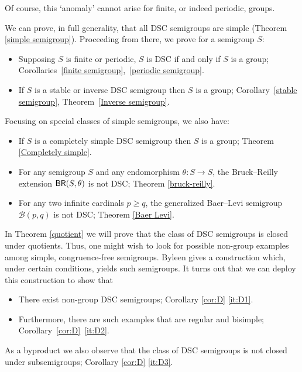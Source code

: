 \documentclass[a4paper, 12pt,reqno]{amsart}
\theoremstyle{plain}
\theoremstyle{definition}
\theoremstyle{remark}
\newcommand{\BR}{\textup{\textsf{BR}}}
\newcommand{\B}{\mathcal{B}}
\newenvironment{nitemize}{\begin{itemize}[label=\textbullet, leftmargin=5mm]}{\end{itemize}}
\begin{document}
Of course, this `anomaly' cannot arise for finite, or indeed periodic, groups.

We can prove, in full generality, that all DSC semigroups are simple (Theorem \ref{simple semigroup}).
Proceeding from there, we prove for a semigroup $S$:

\begin{nitemize}
\item
Supposing $S$ is finite or periodic, $S$ is DSC if and only if $S$ is a group; Corollaries~\ref{finite semigroup},~\ref{periodic semigroup}.
\item
If $S$ is a stable or inverse DSC semigroup then $S$ is a group; Corollary~\ref{stable semigroup}, Theorem~\ref{Inverse semigroup}.
\end{nitemize}

Focusing on special classes of simple semigroups, we also have:

\begin{nitemize}
\item
If $S$ is a completely simple DSC semigroup then $S$ is a group; Theorem \ref{Completely simple}.
\item
For any semigroup $S$ and any endomorphism $\theta\colon S\rightarrow S$, the Bruck--Reilly extension $\BR(S,\theta)$ is not DSC; Theorem \ref{bruck-reilly}.
\item
For any two infinite cardinals $p \geq q$, the generalized Baer--Levi semigroup $\B(p,q)$ is not DSC;
Theorem \ref{Baer Levi}.
\end{nitemize}





In Theorem \ref{quotient} we will prove that the class of DSC semigroups is closed under quotients.
Thus, one might wish to look for possible non-group examples among simple, congruence-free semigroups.
Byleen \cite{Byleen} gives a construction which, under certain conditions, yields such semigroups.
It turns out that we can deploy this construction to show that
    \begin{nitemize}
        \item There exist non-group DSC semigroups; Corollary \ref{cor:D} \ref{it:D1}.
        \item Furthermore, there are such examples that are regular and bisimple; Corollary~\ref{cor:D}~\ref{it:D2}.
    \end{nitemize}

As a byproduct we also observe that the class of DSC semigroups is not closed under subsemigroups;
Corollary \ref{cor:D} \ref{it:D3}.
\end{document}

